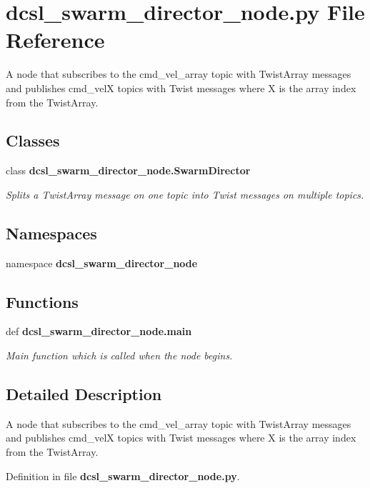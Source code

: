 \section{dcsl\-\_\-swarm\-\_\-director\-\_\-node.\-py \-File \-Reference}
\label{dcsl__swarm__director__node_8py}


\-A node that subscribes to the cmd\-\_\-vel\-\_\-array topic with \-Twist\-Array messages and publishes cmd\-\_\-vel\-X topics with \-Twist messages where \-X is the array index from the \-Twist\-Array.  


\subsection*{\-Classes}
\begin{DoxyCompactItemize}
\item 
class {\bf dcsl\-\_\-swarm\-\_\-director\-\_\-node.\-Swarm\-Director}
\begin{DoxyCompactList}\small\item\em \-Splits a \-Twist\-Array message on one topic into \-Twist messages on multiple topics. \end{DoxyCompactList}\end{DoxyCompactItemize}
\subsection*{\-Namespaces}
\begin{DoxyCompactItemize}
\item 
namespace {\bf dcsl\-\_\-swarm\-\_\-director\-\_\-node}
\end{DoxyCompactItemize}
\subsection*{\-Functions}
\begin{DoxyCompactItemize}
\item 
def {\bf dcsl\-\_\-swarm\-\_\-director\-\_\-node.\-main}
\begin{DoxyCompactList}\small\item\em \-Main function which is called when the node begins. \end{DoxyCompactList}\end{DoxyCompactItemize}


\subsection{\-Detailed \-Description}
\-A node that subscribes to the cmd\-\_\-vel\-\_\-array topic with \-Twist\-Array messages and publishes cmd\-\_\-vel\-X topics with \-Twist messages where \-X is the array index from the \-Twist\-Array. 

\-Definition in file {\bf dcsl\-\_\-swarm\-\_\-director\-\_\-node.\-py}.


